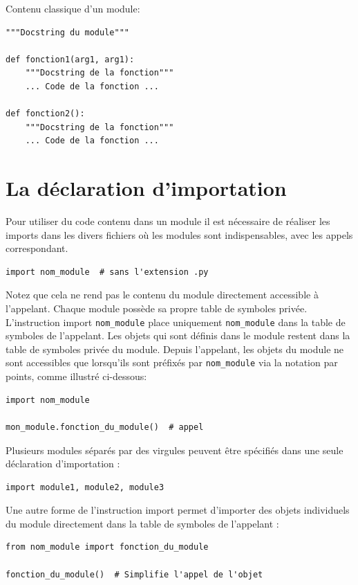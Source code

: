 \documentclass[a4paper,11pt]{book}
\begin{document}
Contenu classique d'un module:
\begin{lstlisting}
"""Docstring du module"""

def fonction1(arg1, arg1):
    """Docstring de la fonction"""
    ... Code de la fonction ...

def fonction2():
    """Docstring de la fonction"""
    ... Code de la fonction ...
\end{lstlisting}
\medskip

\section{La déclaration d'importation}
Pour utiliser du code contenu dans un module il est nécessaire de réaliser les imports dans les divers fichiers où les modules sont indispensables, avec les appels correspondant.
\begin{lstlisting}[caption=Import le plus classique]
import nom_module  # sans l'extension .py
\end{lstlisting}
\medskip

Notez que cela ne rend pas le contenu du module directement accessible à l'appelant. Chaque module possède sa propre table de symboles privée. L'instruction import \texttt{nom\_module} place uniquement \texttt{nom\_module} dans la table de symboles de l'appelant. Les objets qui sont définis dans le module restent dans la table de symboles privée du module. Depuis l'appelant, les objets du module ne sont accessibles que lorsqu'ils sont préfixés par \texttt{nom\_module} via la notation par points, comme illustré ci-dessous:
\begin{lstlisting}[caption=Appel d'un objet du module]
import nom_module  

mon_module.fonction_du_module()  # appel
\end{lstlisting}
\medskip

Plusieurs modules séparés par des virgules peuvent être spécifiés dans une seule déclaration d'importation :
\begin{lstlisting}[caption=Import de plusieurs modules]
import module1, module2, module3
\end{lstlisting}
\medskip

Une autre forme de l'instruction import permet d'importer des objets individuels du module directement dans la table de symboles de l'appelant :
\begin{lstlisting}[caption=Imports individualisés]
from nom_module import fonction_du_module

fonction_du_module()  # Simplifie l'appel de l'objet
\end{lstlisting}
\medskip
\end{document}
